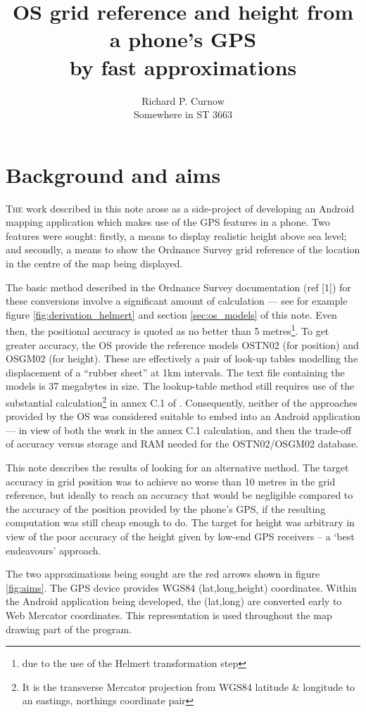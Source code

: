 \documentclass[10pt,a4paper]{article}
\title{OS grid reference and height from a phone's GPS\\by fast approximations}
\author{Richard P. Curnow\\Somewhere in ST 3663}
\begin{document}
\maketitle
\tableofcontents
\clearpage

\section {Background and aims}
\lettrine{T}{he} work described in this note arose as a side-project of
developing an Android mapping application which makes use of the GPS features
in a phone.  Two features were sought: firstly, a means to display realistic
height above sea level; and secondly, a means to show the Ordnance Survey grid
reference of the location in the centre of the map being displayed.

The basic method described in the Ordnance Survey documentation (ref [1]) for
these conversions involve a significant amount of calculation --- see for
example figure \ref{fig:derivation_helmert} and section \ref{sec:os_models} of
this note.  Even then, the positional accuracy is quoted as no better than 5
metres\footnote{due to the use of the Helmert transformation step}.  To get
greater accuracy, the OS provide the reference models OSTN02 (for position) and
OSGM02 (for height).  These are effectively a pair of look-up tables modelling
the displacement of a ``rubber sheet'' at 1km intervals.  The text file
containing the models is 37 megabytes in size.  The lookup-table method still
requires use of the substantial calculation\footnote{It is the transverse
Mercator projection from WGS84 latitude \& longitude to an eastings, northings
coordinate pair} in annex C.1 of \cite{gcs}.  Consequently, neither of the
approaches provided by the OS was considered suitable to embed into an Android
application --- in view of both the work in the annex C.1 calculation, and then
the trade-off of accuracy versus storage and RAM needed for the OSTN02/OSGM02
database.

This note describes the results of looking for an alternative method.  The
target accuracy in grid position was to achieve no worse than 10 metres in the
grid reference, but ideally to reach an accuracy that would be negligible
compared to the accuracy of the position provided by the phone's GPS, if the
resulting computation was still cheap enough to do.  The target for height was
arbitrary in view of the poor accuracy of the height given by low-end GPS
receivers -- a `best endeavours' approach.

The two approximations being sought are the red arrows shown in figure
\ref{fig:aims}.  The GPS device provides WGS84 (lat,long,height) coordinates.
Within the Android application being developed, the (lat,long) are converted
early to Web Mercator coordinates.  This representation is used throughout the
map drawing part of the program.
\end{document}

